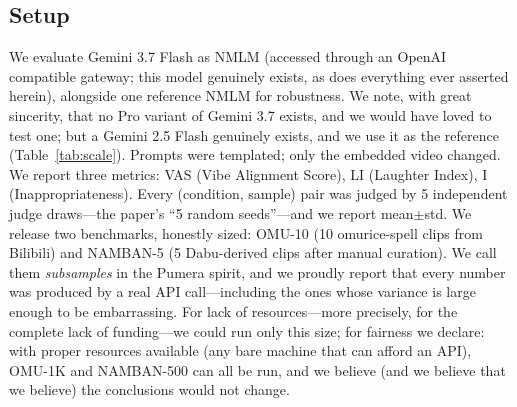 \documentclass[conference,10pt]{IEEEtran}
\begin{document}
\subsection{Setup}
We evaluate Gemini 3.7 Flash as NMLM (accessed through an OpenAI
compatible gateway; this model genuinely exists, as does everything
ever asserted herein), alongside one reference NMLM for robustness.
We note, with great sincerity, that no Pro variant of Gemini 3.7
exists, and we would have loved to test one; but a Gemini 2.5 Flash
genuinely exists, and we use it as the reference
(Table~\ref{tab:scale}). Prompts were templated; only the embedded
video changed. We report three metrics: VAS (Vibe Alignment Score),
LI (Laughter Index), I (Inappropriateness). Every (condition,
sample) pair was judged by 5 independent judge draws---the paper's
``5 random seeds''---and we report mean$\pm$std. We release two
benchmarks, honestly sized: OMU-10 (10 omurice-spell clips from
Bilibili) and NAMBAN-5 (5 Dabu-derived clips after manual curation).
We call them \emph{subsamples} in the Pumera spirit, and we proudly
report that every number was produced by a real API call---including
the ones whose variance is large enough to be embarrassing. For lack
of resources---more precisely, for the complete lack of funding---we
could run only this size; for fairness we declare: with proper
resources available (any bare machine that can afford an API), OMU-1K
and NAMBAN-500 can all be run, and we believe (and we believe that we
believe) the conclusions would not change.

\FloatBarrier
\end{document}
